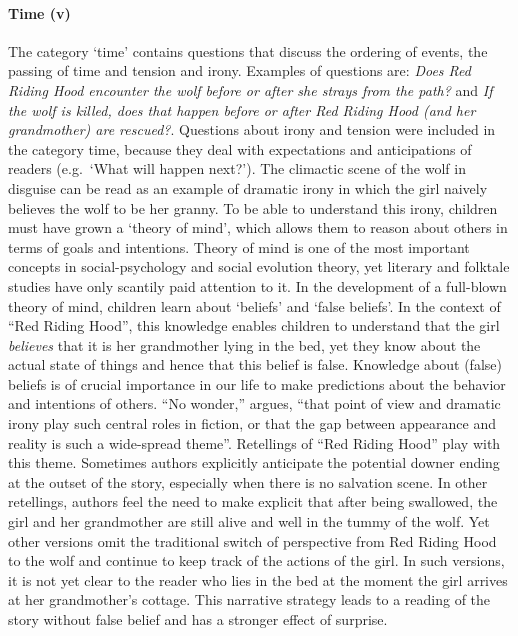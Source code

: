 \paragraph{Time (v)} The category `time' contains questions that discuss the ordering of events, the passing of time and tension and irony. Examples of questions are: \emph{Does Red Riding Hood encounter the wolf before or after she strays from the path?} and \emph{If the wolf is killed, does that happen before or after Red Riding Hood (and her grandmother) are rescued?}. Questions about irony and tension were included in the category time, because they deal with expectations and anticipations of readers (e.g.\ `What will happen next?'). The climactic scene of the wolf in disguise can be read as an example of dramatic irony in which the girl naively believes the wolf to be her granny. To be able to understand this irony, children must have grown a `theory of mind', which allows them to reason about others in terms of goals and intentions. Theory of mind is one of the most important concepts in social-psychology and social evolution theory\autocite[see e.g.][]{tomasello:1999}, yet literary and folktale studies have only scantily paid attention to it\autocite[Cf.][]{boyd:2009}. In the development of a full-blown theory of mind, children learn about `beliefs' and `false beliefs'. In the context of ``Red Riding Hood'', this knowledge enables children to understand that the girl \emph{believes} that it is her grandmother lying in the bed, yet they know about the actual state of things and hence that this belief is false. Knowledge about (false) beliefs is of crucial importance in our life to make predictions about the behavior and intentions of others. ``No wonder,'' \citeauthor{boyd:2009} argues, ``that point of view and dramatic irony play such central roles in fiction, or that the gap between appearance and reality is such a wide-spread theme''\autocite[149]{boyd:2009}. Retellings of ``Red Riding Hood'' play with this theme. Sometimes authors explicitly anticipate the potential downer ending at the outset of the story, especially when there is no salvation scene. In other retellings, authors feel the need to make explicit that after being swallowed, the girl and her grandmother are still alive and well in the tummy of the wolf. Yet other versions omit the traditional switch of perspective from Red Riding Hood to the wolf and continue to keep track of the actions of the girl. In such versions, it is not yet clear to the reader who lies in the bed at the moment the girl arrives at her grandmother's cottage. This narrative strategy leads to a reading of the story without false belief and has a stronger effect of surprise. 

